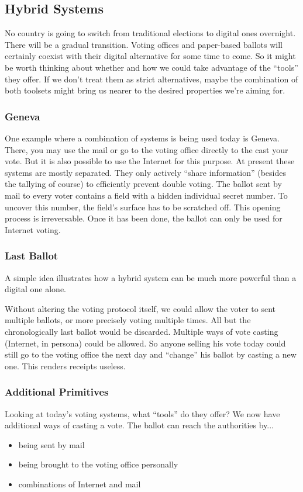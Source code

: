 \documentclass{article}
\begin{document}
\subsection{Hybrid Systems}
No country is going to switch from traditional elections to digital ones overnight. There will be a gradual transition.
Voting offices and paper-based ballots will certainly coexist with their digital alternative for some time to come. So it might be worth thinking about whether and how we could take advantage of the ``tools'' they offer.
If we don't treat them as strict alternatives, maybe the combination of both toolsets might bring us nearer to the desired properties we're aiming for.


\subsubsection{Geneva}
One example where a combination of systems is being used today is Geneva. There, you may use the mail or go to the voting office directly to the cast your vote. But it is also possible to use the Internet for this purpose. At present these systems are mostly separated. They only actively ``share information'' (besides the tallying of course) to efficiently prevent double voting.
The ballot sent by mail to every voter contains a field with a hidden individual secret number. To uncover this number, the field's surface has to be scratched off. This opening process is irreversable. Once it has been done, the ballot can only be used for Internet voting.


\subsubsection{Last Ballot}
A simple idea illustrates how a hybrid system can be much more powerful than a digital one alone.

Without altering the voting protocol itself, we could allow the voter to sent multiple ballots, or more precisely voting multiple times. All but the chronologically last ballot would be discarded. Multiple ways of vote casting (Internet, in persona) could be allowed.
So anyone selling his vote today could still go to the voting office the next day and ``change'' his ballot by casting a new one. This renders receipts useless.


\subsubsection{Additional Primitives}
Looking at today's voting systems, what ``tools'' do they offer?
We now have additional ways of casting a vote. The ballot can reach the authorities by...
\begin{itemize}
  \item being sent by mail
  \item being brought to the voting office personally
  \item combinations of Internet and mail
\end{itemize}
\end{document}
